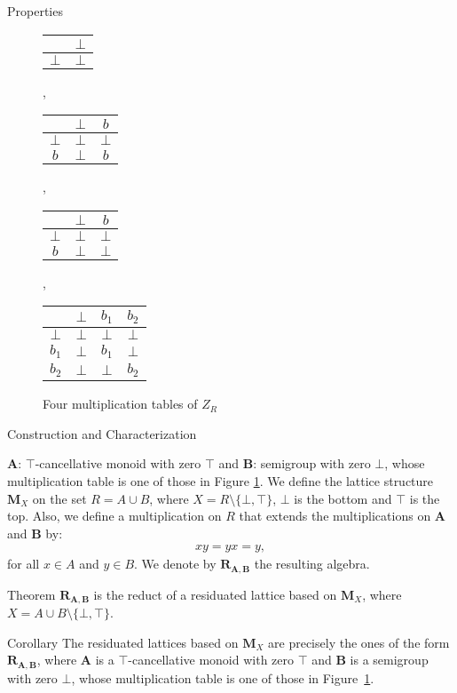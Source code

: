 \documentclass[professionalfont, handout, 10pt]{beamer} %
\theoremstyle{plain}
\theoremstyle{definition}
\begin{document}
\begin{frame}{Properties}
\begin{figure}[h]
\begin{center}
\begin{tabular}{c | c}
 & $\bot$\\
\hline
$\bot$ & $\bot$ 
\end{tabular}
,
\begin{tabular}{c | c c}
 & $\bot$ & $b$\\
\hline
$\bot$ & $\bot$ & $\bot$\\
$b$ & $\bot$ & $b$
\end{tabular}
,
\begin{tabular}{c | c c}
 & $\bot$ & $b$\\
\hline
$\bot$ & $\bot$ & $\bot$\\
$b$ & $\bot$ & $\bot$
\end{tabular}
,
\begin{tabular}{c | c c c}
 & $\bot$ & $b_1$ & $b_2$\\
\hline
$\bot$ & $\bot$ & $\bot$ & $\bot$\\
$b_1$ & $\bot$ & $b_1$ & $\bot$\\
$b_2$ & $\bot$ & $\bot$ & $b_2$ 	
\end{tabular}
\end{center}
\caption{Four multiplication tables of $Z_R$}
\label{f:4tables}
\end{figure}

\end{frame}

\begin{frame}{Construction and Characterization}

$\mathbf{A}$: $\top$-cancellative monoid with zero $\top$ and $\mathbf{B}$: semigroup with zero $\bot$, whose multiplication table is one of those in Figure \ref{f:4tables}.\pause
We define the lattice structure $\mathbf{M}_X$ on the set $R = A \cup B$, where $X = R \setminus \{\bot, \top\}$, $\bot$ is the bottom and $\top$ is the top. \pause
Also, we define a multiplication on $R$ that extends the multiplications on $\mathbf{A}$ and $\mathbf{B}$ by:
\begin{align*}
    xy = yx = y,
\end{align*}
for all $x \in A$ and $y \in B$.
We denote by $\mathbf{R}_{\mathbf{A}, \mathbf{B}}$ the resulting algebra.\pause

\begin{block}{Theorem}
    $\mathbf{R}_{\mathbf{A}, \mathbf{B}}$ is the reduct of a residuated lattice based on $\mathbf{M}_X$, where $X = A \cup B \setminus \{\bot, \top\}$.
\end{block}
\pause

\begin{block}{Corollary}
    The residuated lattices based on $\mathbf{M}_X$ are precisely the ones of the form $\mathbf{R}_{\mathbf{A}, \mathbf{B}}$, where $\mathbf{A}$ is a $\top$-cancellative monoid with zero $\top$ and $\mathbf{B}$ is a semigroup with zero $\bot$, whose multiplication table is one of those in Figure~\ref{f:4tables}.
\end{block}
\end{frame}
\end{document}
